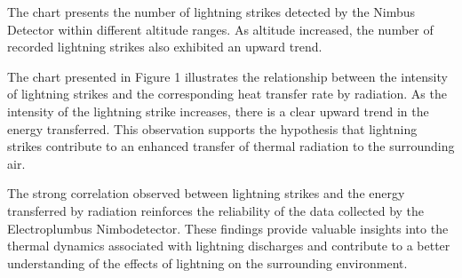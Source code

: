 \documentclass[portuguese]{cenarticle}
\begin{document}
\begin{center}
\end{center}

The chart presents the number of lightning strikes detected by the Nimbus Detector within different altitude ranges. As altitude increased, the number of recorded lightning strikes also exhibited an upward trend.

The chart presented in Figure 1 illustrates the relationship between the intensity of lightning strikes and the corresponding heat transfer rate by radiation. As the intensity of the lightning strike increases, there is a clear upward trend in the energy transferred. This observation supports the hypothesis that lightning strikes contribute to an enhanced transfer of thermal radiation to the surrounding air.

The strong correlation observed between lightning strikes and the energy transferred by radiation reinforces the reliability of the data collected by the Electroplumbus Nimbodetector. These findings provide valuable insights into the thermal dynamics associated with lightning discharges and contribute to a better understanding of the effects of lightning on the surrounding environment.
\end{document}
